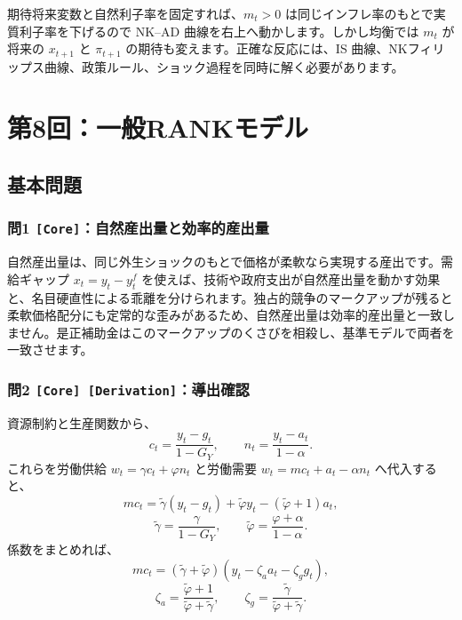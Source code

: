 \documentclass[
  japanese,
  lualatex,
  ja=standard,
  11pt,
  a4paper]{ltjsarticle}
\begin{document}
期待将来変数と自然利子率を固定すれば、\(m_t>0\)
は同じインフレ率のもとで実質利子率を下げるので NK--AD
曲線を右上へ動かします。しかし均衡では \(m_t\) が将来の \(x_{t+1}\) と
\(\pi_{t+1}\) の期待も変えます。正確な反応には、IS
曲線、NKフィリップス曲線、政策ルール、ショック過程を同時に解く必要があります。

\clearpage

\section{第8回：一般RANKモデル}\label{ux7b2c8ux56deux4e00ux822crankux30e2ux30c7ux30eb}

\subsection{基本問題}\label{ux57faux672cux554fux984c-7}

\subsubsection{\texorpdfstring{問1
\texttt{{[}Core{]}}：自然産出量と効率的産出量}{問1 {[}Core{]}：自然産出量と効率的産出量}}\label{ux554f1-coreux81eaux7136ux7523ux51faux91cfux3068ux52b9ux7387ux7684ux7523ux51faux91cf}

自然産出量は、同じ外生ショックのもとで価格が柔軟なら実現する産出です。需給ギャップ
\(x_t=y_t-y_t^f\)
を使えば、技術や政府支出が自然産出量を動かす効果と、名目硬直性による乖離を分けられます。独占的競争のマークアップが残ると柔軟価格配分にも定常的な歪みがあるため、自然産出量は効率的産出量と一致しません。是正補助金はこのマークアップのくさびを相殺し、基準モデルで両者を一致させます。

\subsubsection{\texorpdfstring{問2
\texttt{{[}Core{]}\ {[}Derivation{]}}：導出確認}{問2 {[}Core{]} {[}Derivation{]}：導出確認}}\label{ux554f2-core-derivationux5c0eux51faux78baux8a8d-1}

資源制約と生産関数から、 \[
c_t=\frac{y_t-g_t}{1-G_Y},
\qquad
n_t=\frac{y_t-a_t}{1-\alpha}.
\] これらを労働供給 \(w_t=\gamma c_t+\varphi n_t\) と労働需要
\(w_t=mc_t+a_t-\alpha n_t\) へ代入すると、 \[
mc_t
=\widetilde\gamma(y_t-g_t)
+\widetilde\varphi y_t-(\widetilde\varphi+1)a_t,
\] \[
\widetilde\gamma=\frac{\gamma}{1-G_Y},
\qquad
\widetilde\varphi=\frac{\varphi+\alpha}{1-\alpha}.
\] 係数をまとめれば、 \[
mc_t=(\widetilde\gamma+\widetilde\varphi)
(y_t-\zeta_aa_t-\zeta_gg_t),
\] \[
\zeta_a=\frac{\widetilde\varphi+1}{\widetilde\varphi+\widetilde\gamma},
\qquad
\zeta_g=\frac{\widetilde\gamma}{\widetilde\varphi+\widetilde\gamma}.
\]
\end{document}
